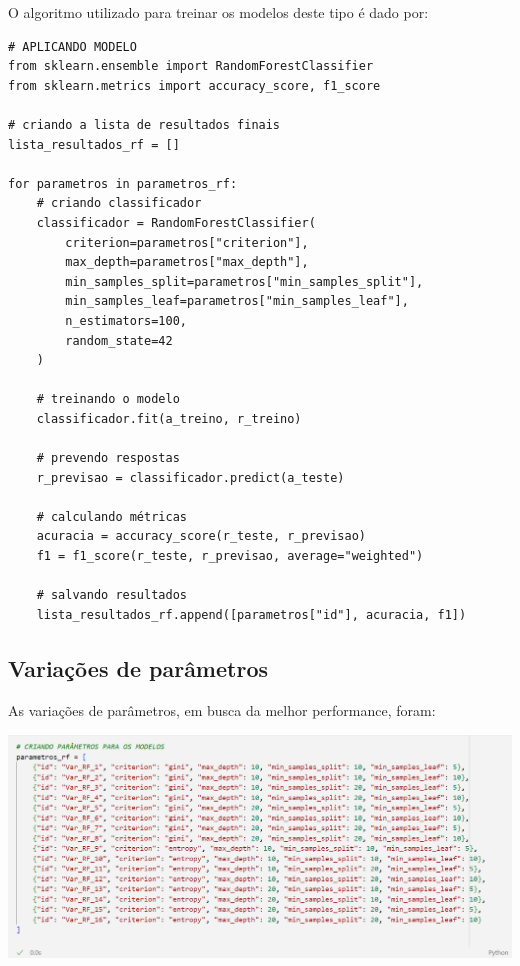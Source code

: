 \documentclass[12pt,a4paper]{article}
\begin{document}
\quad\space O algoritmo utilizado para treinar os modelos deste tipo é dado por:

\begin{mdframed}
	\begin{verbatim}
# APLICANDO MODELO
from sklearn.ensemble import RandomForestClassifier
from sklearn.metrics import accuracy_score, f1_score

# criando a lista de resultados finais
lista_resultados_rf = []

for parametros in parametros_rf:
	# criando classificador
	classificador = RandomForestClassifier(
		criterion=parametros["criterion"], 
		max_depth=parametros["max_depth"], 
		min_samples_split=parametros["min_samples_split"], 
		min_samples_leaf=parametros["min_samples_leaf"], 
		n_estimators=100, 
		random_state=42
	)
	
	# treinando o modelo
	classificador.fit(a_treino, r_treino)
	
	# prevendo respostas
	r_previsao = classificador.predict(a_teste)
	
	# calculando métricas
	acuracia = accuracy_score(r_teste, r_previsao)
	f1 = f1_score(r_teste, r_previsao, average="weighted")
	
	# salvando resultados
	lista_resultados_rf.append([parametros["id"], acuracia, f1])
	\end{verbatim}
\end{mdframed}

\vspace{0.5cm}
\subsection{Variações de parâmetros}

\quad\space As variações de parâmetros, em busca da melhor performance, foram:

\begin{center}
	\includegraphics[width=\textwidth]{imagem/rfp.png}
\end{center}
\end{document}
